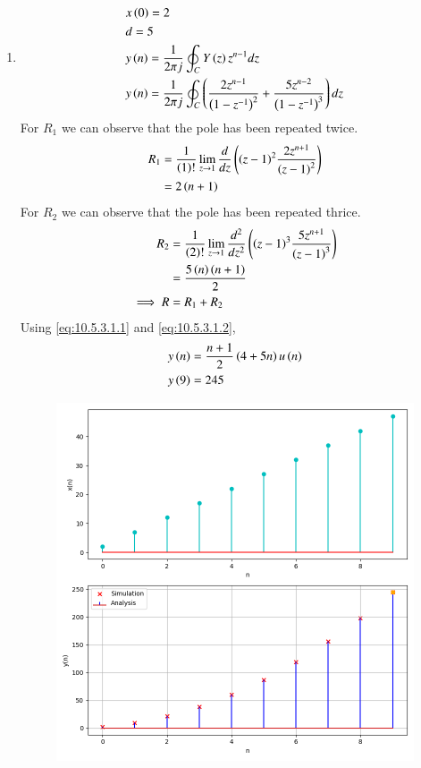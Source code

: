 \documentclass[journal,12pt,twocolumn]{IEEEtran}
\theoremstyle{remark}
\begin{document}
\begin{enumerate}[label=(\alph*)]
    \item \begin{align}
        &x\left(0\right)=2 \\
        &d=5 \\
        &y\left(n\right)=\frac{1}{2\pi j}\oint_{C}Y\left(z\right)z^{n-1}dz  \\
        &y\left(n\right)=\frac{1}{2\pi j}\oint_{C}\left(\dfrac{2z^{n-1}}{\left(1-z^{-1}\right)^2} + \dfrac{5z^{n-2}}{\left(1-z^{-1}\right)^{3}}\right)dz \\
    \end{align}
    For $R_1$ we can observe that the pole has been repeated twice.
\begin{align}
    R_1&=\frac{1}{\left(1\right)!}\lim\limits_{z\to 1}\frac{d}{dz}\left({\left(z-1\right)}^{2}\frac{2z^{n+1}}{{\left(z-1\right)}^2}\right)\\
    &=2\left(n+1\right)\label{eq:10.5.3.1.1}
\end{align}
    For $R_2$ we can observe that the pole has been repeated thrice.
\begin{align}
    R_2&=\frac{1}{\left(2\right)!}\lim\limits_{z\to 1}\frac{d^{2}}{dz^{2}}\left({\left(z-1\right)}^{3}\frac{5z^{n+1}}{{\left(z-1\right)}^3}\right)\\
    &=\frac{5\left(n\right)\left(n+1\right)}{2}\label{eq:10.5.3.1.2} \\
    \implies R&= R_1 + R_2
\end{align}
Using \eqref{eq:10.5.3.1.1} and \eqref{eq:10.5.3.1.2},
\begin{align}
    &y\left(n\right)=\dfrac{n+1}{2}\left(4+5n\right)u\left(n\right) \\
    &y\left(9\right)=245
\end{align}
    \begin{figure}[h!]
        \centering
        \includegraphics[width=\columnwidth]{figs/plt1.png}

\end{figure}
\end{enumerate}
\end{document}
